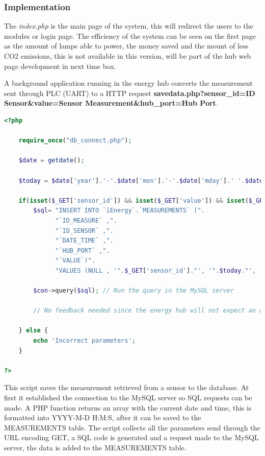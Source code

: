 \subsubsection{Implementation}
%
%

The \textit{index.php} is the main page of the system, this will redirect the users to the modules or login page.
The efficiency of the system can be seen on the first page as the amount of lamps able to power, the money saved and the mount of less CO2 emissions, this is not available in this version, will be part of the hub web page development in next time box.


A background application running in the energy hub converts the measurement sent through PLC (UART) to a HTTP request \textbf{savedata.php?sensor\_id=ID Sensor\&value=Sensor Measurement\&hub\_port=Hub Port}.

\begin{lstlisting}[language=php]
<?php
	
	require_once("db_connect.php");
	
	$date = getdate();
	
	$today = $date['year'].'-'.$date['mon'].'-'.$date['mday'].' '.$date['hours'].':'.$date['minutes'].':'.$date['seconds'];

	if(isset($_GET['sensor_id']) && isset($_GET['value']) && isset($_GET['hub_port'])){
		$sql= "INSERT INTO `iEnergy`.`MEASUREMENTS` (".
			  "`ID_MEASURE` ,".
			  "`ID_SENSOR` ,".
			  "`DATE_TIME` ,".
			  "`HUB_PORT` ,".
			  "`VALUE`)".
			  "VALUES (NULL , '".$_GET['sensor_id']."', '".$today."', '".$_GET['hub_port']."', '".$_GET['value']."')";
	
		$con->query($sql); // Run the query in the MySQL server
		
		// No feedback needed since the energy hub will not expect an answer.
		
	} else {
		echo 'Incorrect parameters';
	}
	
?>
\end{lstlisting}

This script saves the measurement retrieved from a sensor to the database. At first it established the connection to the MySQL server so SQL requests can be made.
A PHP function returns an array with the current date and time, this is formatted into YYYY-M-D H:M:S, after it can be saved to the MEASUREMENTS table. The script collects all the parameters send through the URL encoding GET, a SQL code is generated and a request made to the MySQL server, the data is added to the MEASUREMENTS table.

